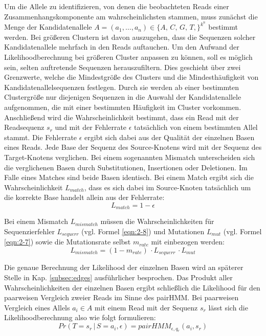 Um die Allele zu identifizieren, von denen die beobachteten Reads einer Zusammenhangskomponente am wahrscheinlichsten stammen, muss zunächst die Menge der Kandidatenallele $A=(a_{1}, \dots, a_{n}) \in \{A,\,C,\,G,\,T,\}^{k^n}$ bestimmt werden. Bei größeren Clustern ist davon auszugehen, dass die Sequenzen solcher Kandidatenallele mehrfach in den Reads auftauchen. Um den Aufwand der Likelihoodberechnung bei größeren Cluster anpassen zu können, soll es möglich sein, selten auftretende Sequenzen herauszufiltern. Dies geschieht über zwei Grenzwerte, welche die Mindestgröße des Clusters und die Mindesthäufigkeit von Kandidatenallelsequenzen festlegen. Durch sie werden ab einer bestimmten Clustergröße nur diejenigen Sequenzen in die Auswahl der Kandidatenallele aufgenommen, die mit einer bestimmten Häufigkeit im Cluster vorkommen.\\

Anschließend wird die Wahrscheinlichkeit bestimmt, dass ein Read mit der Readsequenz $s_{r}$ und mit der Fehlerrate $\epsilon$ tatsächlich von einem bestimmten Allel stammt. Die Fehlerrate $\epsilon$ ergibt sich dabei aus der Qualität der einzelnen Basen eines Reads. Jede Base der Sequenz des Source-Knotens wird mit der Sequenz des Target-Knotens verglichen. Bei einem sogenannten Mismatch unterscheiden sich die verglichenen Basen durch Substitutionen, Insertionen oder Deletionen. Im Falle eines Matches sind beide Basen identisch. Bei einem Match ergibt sich die Wahrscheinlichkeit $L_{match}$, dass es sich dabei im Source-Knoten tatsächlich um die korrekte Base handelt allein aus der Fehlerrate:
\begin{equation} \label{eqn:2-13}
\tag{2-13}
L_{match} = 1 - \epsilon
\end{equation}

Bei einem Mismatch $L_{mismatch}$ müssen die Wahrscheinlichkeiten für Sequenzierfehler $L_{sequerr}$ (vgl. Formel \eqref{eqn:2-8}) und Mutationen $L_{mut}$ (vgl. Formel \eqref{eqn:2-7}) sowie die Mutationsrate selbst $m_{rate}$ mit einbezogen werden: 
\begin{equation} \label{eqn:2-14}
\tag{2-14}
L_{mismatch} = (1 - m_{rate}) \, \cdotp L_{sequerr} \, \cdotp L_{mut}
\end{equation}

Die genaue Berechnung der Likelihood der einzelnen Basen wird an späterer Stelle in Kap. \ref{subsec:edges} ausführlicher besprochen. Das Produkt aller Wahrscheinlichkeiten der einzelnen Basen ergibt schließlich die Likelihood für den paarweisen Vergleich zweier Reads im Sinne des pairHMM. Bei paarweisen Vergleich eines Allels $a_{i} \in A $ mit einem Read mit der Sequenz $s_{r}$ lässt sich die Likelihoodberechnung also wie folgt formulieren:
\begin{equation} \label{eqn:2-15}
\tag{2-15}
Pr(T=s_{r} \, | \, S=a_{i}, \epsilon) = pairHMM_{\epsilon,q_{r}}(a_{i}, s_{r})
\end{equation}


